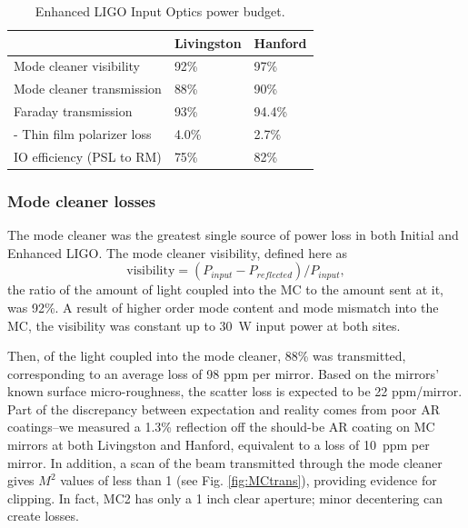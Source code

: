 \begin{table}
\centering
\begin{tabular}{l l l}
 & Livingston & Hanford \\
\hline\hline
Mode cleaner visibility & 92\% & 97\% \\
Mode cleaner transmission & 88\% & 90\% \\
Faraday transmission &       93\% & 94.4\%\\
\hspace{0.5cm} - Thin film polarizer loss &       4.0\% & 2.7\% \\ 
IO efficiency (PSL to RM) & 75\% & 82\% \\
\hline
\end{tabular}
\caption{Enhanced LIGO Input Optics power budget.}
\label{tab:pwrbudget}
\end{table}

\subsubsection{Mode cleaner losses} 
The mode cleaner was the greatest single source of power loss in both
Initial and Enhanced LIGO. The mode cleaner visibility, defined here as
\begin{equation}
\mbox{visibility} = (P_{input} - P_{reflected})/P_{input}, 
\end{equation}
the ratio of the amount of light coupled into the MC to the amount
sent at it, was 92\%. A result of higher order mode content and mode
mismatch into the MC, the visibility was constant up to 30~W input
power at both sites.

Then, of the light coupled into the mode cleaner, 88\% was
transmitted, corresponding to an average loss of 98 ppm per
mirror. Based on the mirrors' known surface micro-roughness, the
scatter loss is expected to be 22 ppm/mirror. Part of the discrepancy
between expectation and reality comes from poor AR coatings--we
measured a 1.3\% reflection off the should-be AR coating on MC mirrors
at both Livingston and Hanford, equivalent to a loss of 10~ppm per
mirror. In addition, a scan of the beam transmitted through the
mode cleaner gives $M^2$ values of less than 1 (see Fig. \ref{fig:MCtrans}), providing evidence for
clipping. In fact, MC2 has only a 1 inch clear aperture; minor
decentering can create losses. 

